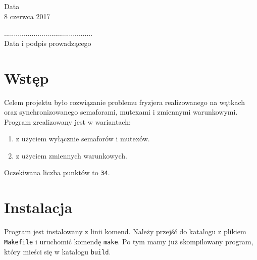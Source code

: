\documentclass[12pt,a4paper]{article}
\newcommand{\datazajec}{8 czerwca 2017}
\begin{document}
	\begin{minipage}[t]{0.4\linewidth}
		\centering
		Data \\
		\small \datazajec
	\end{minipage}
	
	\begin{flushright}
		\begin{minipage}[t]{0.5\linewidth}
			\centering
			............................................. \\
			\small \textsf{Data i podpis prowadzącego}
		\end{minipage}
	\end{flushright}
	\pagebreak
	
	\section{Wstęp}
	Celem projektu było rozwiązanie problemu fryzjera realizowanego na wątkach oraz 
	synchronizowanego semaforami, mutexami i zmiennymi warunkowymi.\\
	Program zrealizowany jest w wariantach:
	\begin{enumerate}[label=\alph*)]
		\item z użyciem wyłącznie semaforów i mutexów.
		\item z użyciem zmiennych warunkowych.
	\end{enumerate}
	Oczekiwana liczba punktów to \texttt{34}.
	
	\section{Instalacja}
	Program jest instalowany z linii komend. Należy przejść do katalogu z plikiem 
	\texttt{Makefile} i uruchomić komendę \texttt{make}. Po tym mamy już skompilowany 
	program, który mieści się w katalogu \texttt{build}.
	
\end{document}
